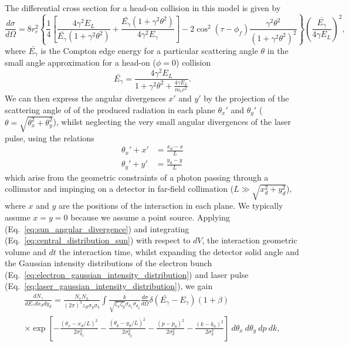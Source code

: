 \documentclass[../main.tex]{subfiles}
\begin{document}
The differential cross section for a head-on collision in this model is given by
\begin{equation}
\frac{d\sigma}{d\Omega} = 8r_{e}^{2}\left\{\frac{1}{4}\left[\frac{4\gamma^{2}E_{L}}{\bar{E_{\gamma}}\left(1+\gamma^{2}\theta^{2}\right)}+\frac{\bar{E_{\gamma}}\left(1+\gamma^{2}\theta^{2}\right)}{4\gamma^{2}E_{\gamma}}\right]-2\cos^{2}\left(\tau-\phi_{f}\right)\frac{\gamma^{2}\theta^{2}}{\left(1+\gamma^{2}\theta^{2}\right)^{2}}\right\}\left(\frac{\bar{E_{\gamma}}}{4\gamma E_{L}}\right)^{2},
\label{eq:sun_differential_cross_section}    
\end{equation}
where $\bar{E_{\gamma}}$ is the Compton edge energy for a particular scattering angle $\theta$ in the small angle approximation for a head-on ($\phi=0$) collision
\begin{equation}
\bar{E_{\gamma}} = \frac{4\gamma^{2}E_{L}}{1+\gamma^{2}\theta^{2}+\frac{4\gamma E_{L}}{m_{e}c^{2}}}.
\label{eq:sun_Egamma_bar}    
\end{equation}
We can then express the angular divergences $x'$ and $y'$ by the projection of the scattering angle of of the produced radiation in each plane $\theta_{x}'$ and $\theta_{y}'$ ($\theta = \sqrt{\theta_{x}^{2}+\theta_{y}^{2}}$), whilst neglecting the very small angular divergences of the laser pulse, using the relations
\begin{align}
\theta_{x}' + x' &= \frac{x_{d}-x}{L} \\
\theta_{y}' + y' &= \frac{y_{d}-y}{L}
\label{eq:sun_angular_divergence}    
\end{align}
which arise from the geometric constraints of a photon passing through a collimator and impinging on a detector in far-field collimation ($L \gg \sqrt{x_{d}^{2}+y_{d}^{2}}$), where $x$ and $y$ are the positions of the interaction in each plane. We typically assume $x=y=0$ because we assume a point source. Applying (Eq.~\ref{eq:sun_angular_divergence}) and integrating (Eq.~\ref{eq:central_distribution_sun}) with respect to $dV$, the interaction geometric volume and $dt$ the interaction time, whilst expanding the detector solid angle and the Gaussian intensity distributions of the electron bunch (Eq.~\ref{eq:electron_gaussian_intensity_distribution}) and laser pulse (Eq.~\ref{eq:laser_gaussian_intensity_distribution}), we gain
\begin{multline}
\frac{dN_{\gamma}}{dE_{\gamma}dx_{d}dy_{d}} = \frac{N_{e}N_{L}}{\left(2\pi\right)^{3}z_{R}\sigma_{p}\sigma_{k}}\int \frac{k}{\sqrt{\zeta_{x}\zeta_{y}}\sigma_{\theta_{x}}\sigma_{\theta_{y}}}\frac{d\sigma}{d\Omega}\delta\left(\bar{E_{\gamma}}-E_{\gamma}\right)\left(1+\beta\right) \\\times\exp\left[-\frac{\left(\theta_{x}-x_{d}/L\right)^{2}}{2\sigma_{\theta_{x}}^{2}}-\frac{\left(\theta_{y}-y_{d}/L\right)^{2}}{2\sigma_{\theta_{y}}^{2}}-\frac{\left(p-p_{0}\right)^{2}}{2\sigma_{p}^{2}}-\frac{\left(k-k_{0}\right)^{2}}{2\sigma_{k}^{2}}\right]~d\theta_{x}~d\theta_{y}~dp~dk,
\label{eq:sun_volume_time_integral}    
\end{multline}
\end{document}
